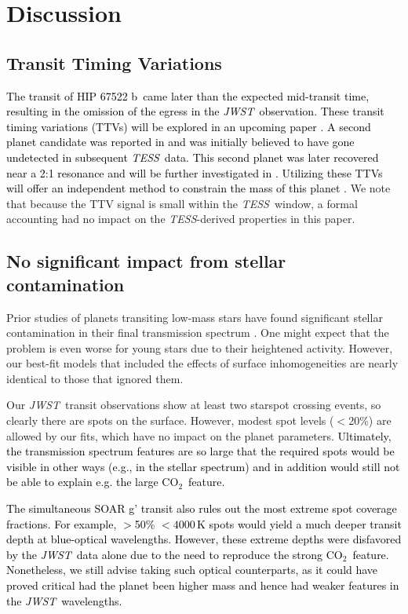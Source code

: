 \documentclass[twocolumn]{aastex63} %
\newcommand{\tess}{\textit{TESS}}
\newcommand{\jwst}{\textit{JWST}}
\newcommand{\cotwo}{CO$_2$}
\newcommand{\plname}{HIP 67522 b}
\newcommand{\newedit}[1]{\textcolor{black}{#1}}
\begin{document}
\section{Discussion}  \label{sec:discuss}

\subsection{Transit Timing Variations}

\newedit{The transit of \plname\ came later than the expected mid-transit time, resulting in the omission of the egress in the \jwst\, observation. These transit timing variations (TTVs) will be explored in an upcoming paper \citep{LopezMurillo_inprep}. A second planet candidate was reported in \citet{Rizzuto2020} and was initially believed to have gone undetected in subsequent \tess\ data. This second planet was later recovered near a 2:1 resonance and will be further investigated in  \cite{barber2024tess}. Utilizing these TTVs will offer an independent method to constrain the mass of this planet \citep{Thao_inprep}.}  We note that because the TTV signal is small within the \tess\ window, a formal accounting had no impact on the \tess-derived properties in this paper. 




\subsection{No significant impact from stellar contamination}

Prior studies of planets transiting low-mass stars have found significant stellar contamination in their final transmission spectrum \citep[e.g.,][]{Barclay2021, Lim2023}. One might expect that the problem is even worse for young stars due to their heightened activity. However, our best-fit models that included the effects of surface inhomogeneities are nearly identical to those that ignored them.  

Our \jwst\, transit observations show at least two starspot crossing events, so clearly there are spots on the surface. However, modest spot levels ($<$20\%) are allowed by our fits, which have no impact on the planet parameters. \newedit{Ultimately, the transmission spectrum features are so large that the required spots would be visible in other ways (e.g., in the stellar spectrum) and in addition would still not be able to explain e.g. the large \cotwo\ feature.}


\newedit{The simultaneous SOAR g' transit also rules out the most extreme spot coverage fractions. For example, $>$50\% $<4000$\,K spots would yield a much deeper transit depth at blue-optical wavelengths. However, these extreme depths were disfavored by the \jwst\ data alone due to the need to reproduce the strong \cotwo\ feature. Nonetheless, we still advise taking such optical counterparts, as it could have proved critical had the planet been higher mass and hence had weaker features in the \jwst~wavelengths.}
\end{document}
